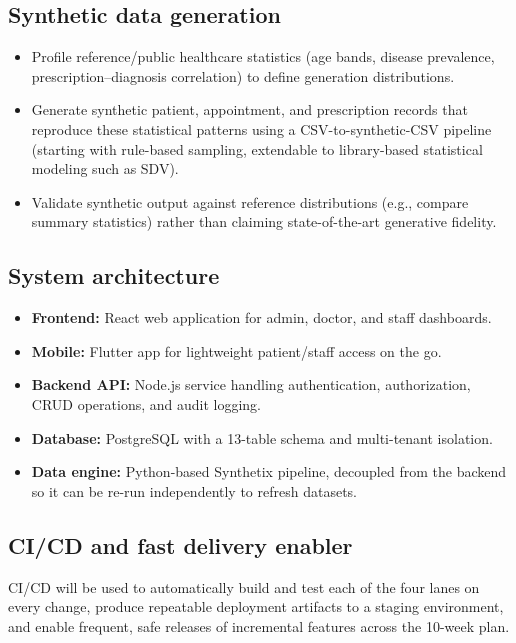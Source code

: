 \documentclass[11pt]{article}
\begin{document}
\subsection{Synthetic data generation}
\begin{itemize}
    \item Profile reference/public healthcare statistics (age bands, disease prevalence, prescription--diagnosis correlation) to define generation distributions.
    \item Generate synthetic patient, appointment, and prescription records that reproduce these statistical patterns using a CSV-to-synthetic-CSV pipeline (starting with rule-based sampling, extendable to library-based statistical modeling such as SDV).
    \item Validate synthetic output against reference distributions (e.g., compare summary statistics) rather than claiming state-of-the-art generative fidelity.
\end{itemize}

\subsection{System architecture}
\begin{itemize}
    \item \textbf{Frontend:} React web application for admin, doctor, and staff dashboards.
    \item \textbf{Mobile:} Flutter app for lightweight patient/staff access on the go.
    \item \textbf{Backend API:} Node.js service handling authentication, authorization, CRUD operations, and audit logging.
    \item \textbf{Database:} PostgreSQL with a 13-table schema and multi-tenant isolation.
    \item \textbf{Data engine:} Python-based Synthetix pipeline, decoupled from the backend so it can be re-run independently to refresh datasets.
\end{itemize}

\subsection{CI/CD and fast delivery enabler}
CI/CD will be used to automatically build and test each of the four lanes on every change, produce repeatable deployment artifacts to a staging environment, and enable frequent, safe releases of incremental features across the 10-week plan.
\end{document}
